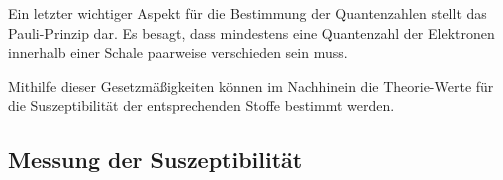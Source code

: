     Ein letzter wichtiger Aspekt für die Bestimmung der Quantenzahlen stellt das Pauli-Prinzip dar. 
    Es besagt, dass mindestens eine Quantenzahl der Elektronen innerhalb einer Schale paarweise verschieden sein muss. 
    
    Mithilfe dieser Gesetzmäßigkeiten können im Nachhinein die Theorie-Werte für die Suszeptibilität der entsprechenden Stoffe bestimmt werden. 

\subsection{Messung der Suszeptibilität}

    